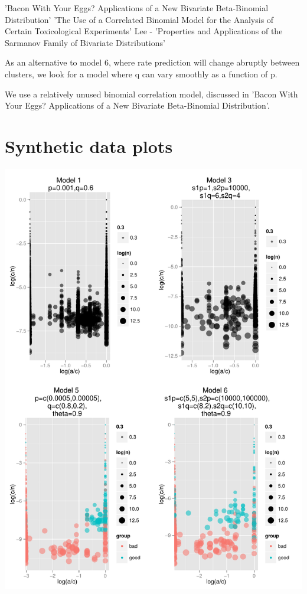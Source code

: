 \documentclass[11pt,a4,singlespacing,titlepagenumber=on]{scrreprt}
\numberwithin{equation}{chapter} %
\theoremstyle{remark}
\begin{document}
'Bacon With Your Eggs? Applications of a New Bivariate Beta-Binomial Distribution'
'The Use of a Correlated Binomial Model for the Analysis of Certain Toxicological Experiments'
Lee - 'Properties and Applications of the Sarmanov Family of Bivariate Distributions'

As an alternative to model 6, where rate prediction will change abruptly between clusters, we look for a model where q can vary smoothly as a function of p.

We use a relatively unused binomial correlation model, discussed in 'Bacon With Your Eggs? Applications of a New Bivariate Beta-Binomial Distribution'. 

\section{Synthetic data plots}

\includegraphics[scale=0.7]{SynthData}
\end{document}
